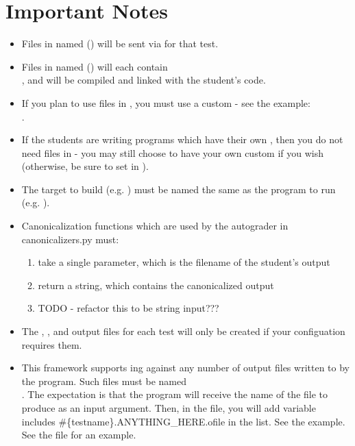 \documentclass[11pt]{report}
\begin{document}
\section*{Important Notes}
\begin{itemize}
      \item Files in  named  ()  
            will be sent via  for that test. 
      \item Files in  named  ()
            will each contain \\, and will be compiled and linked with the 
            student's code.
      \item If you plan to use files in , you must use a custom  - see the 
            example: \\.
      \item If the students are writing programs which have their own , then you do not 
            need files in  - you may still choose to have your own custom 
            if you wish (otherwise, be sure to set  in ). 
      \item The target to build (e.g. ) must be named the same as the program to
            run (e.g. ).
      \item Canonicalization functions which are used by the autograder in canonicalizers.py must:
            \begin{enumerate}
                  \item take a single parameter, which is the filename of the student's output 
                  \item return a string, which contains the canonicalized output 
                  \item TODO - refactor this to be string input???
            \end{enumerate}
      \item The , , and  output files for each test 
      will only be created if your configuation requires them.
      \item This framework supports ing against any number of output files written 
      to by the program. Such files must be named \\. The
      expectation is that the program will receive the name of the file to produce as an 
      input argument. Then, in the  file, you will add  variable includes
      \#\{testname\}.ANYTHING\_HERE.ofile in the  list. See the  example. See 
      the  file for an example. 
                        

\end{itemize}
\end{document}
